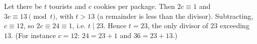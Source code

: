 Let there be $t$ tourists and $c$ cookies per package. Then $2c\equiv1$ and $3c\equiv13\pmod t$, with $t>13$ (a remainder is less than the divisor). Subtracting, $c\equiv12$, so $2c\equiv24\equiv1$, i.e. $t\mid23$. Hence $t=\boxed{23}$, the only divisor of $23$ exceeding $13$. (For instance $c=12$: $24=23+1$ and $36=23+13$.)
